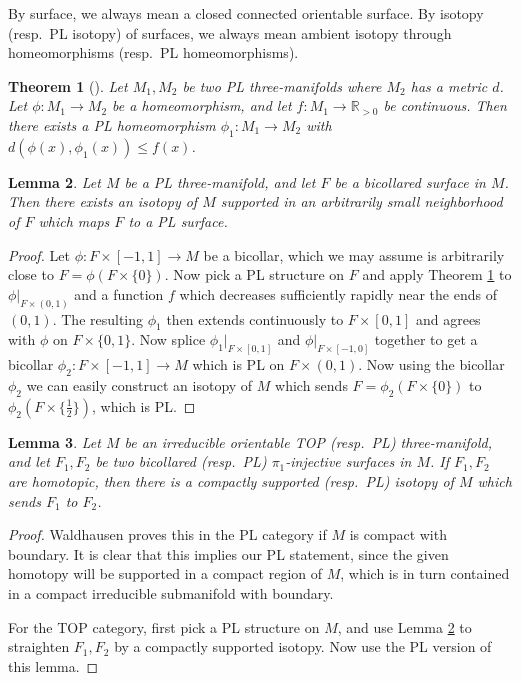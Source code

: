 \documentclass[12pt]{article}
\theoremstyle{plain}
\newtheorem{theorem}{Theorem}[section]
\newtheorem{lemma}[theorem]{Lemma}
\theoremstyle{definition}
\theoremstyle{remark}
\numberwithin{equation}{section}
\begin{document}
By surface, we always mean a closed connected orientable surface.  By isotopy (resp.\ PL isotopy) of surfaces, we always mean ambient isotopy through homeomorphisms (resp.\ PL homeomorphisms).

\begin{theorem}[{\cite[p62 Theorem 8]{bing}}]\label{bingplapproxthm}
Let $M_1,M_2$ be two PL three-manifolds where $M_2$ has a metric $d$.  Let $\phi:M_1\to M_2$ be a homeomorphism, and let $f:M_1\to\mathbb R_{>0}$ be continuous.  Then there exists a PL homeomorphism $\phi_1:M_1\to M_2$ with $d(\phi(x),\phi_1(x))\leq f(x)$.
\end{theorem}

\begin{lemma}\label{straightening}
Let $M$ be a PL three-manifold, and let $F$ be a bicollared surface in $M$.  Then there exists an isotopy of $M$ supported in an arbitrarily small neighborhood of $F$ which maps $F$ to a PL surface.
\end{lemma}

\begin{proof}
Let $\phi:F\times[-1,1]\to M$ be a bicollar, which we may assume is arbitrarily close to $F=\phi(F\times\{0\})$.  Now pick a PL structure on $F$ and apply Theorem \ref{bingplapproxthm} to $\phi|_{F\times(0,1)}$ and a function $f$ which decreases sufficiently rapidly near the ends of $(0,1)$.  The resulting $\phi_1$ then extends continuously to $F\times[0,1]$ and agrees with $\phi$ on $F\times\{0,1\}$.  Now splice $\phi_1|_{F\times[0,1]}$ and $\phi|_{F\times[-1,0]}$ together to get a bicollar $\phi_2:F\times[-1,1]\to M$ which is PL on $F\times(0,1)$.  Now using the bicollar $\phi_2$ we can easily construct an isotopy of $M$ which sends $F=\phi_2(F\times\{0\})$ to $\phi_2(F\times\{\frac 12\})$, which is PL.
\end{proof}

\begin{lemma}\label{homotopicisotopic}
Let $M$ be an irreducible orientable TOP (resp.\ PL) three-manifold, and let $F_1,F_2$ be two bicollared (resp.\ PL) $\pi_1$-injective surfaces in $M$.  If $F_1,F_2$ are homotopic, then there is a compactly supported (resp.\ PL) isotopy of $M$ which sends $F_1$ to $F_2$.
\end{lemma}

\begin{proof}
Waldhausen \cite[p76 Corollary 5.5]{waldhausen} proves this in the PL category if $M$ is compact with boundary.  It is clear that this implies our PL statement, since the given homotopy will be supported in a compact region of $M$, which is in turn contained in a compact irreducible submanifold with boundary.

For the TOP category, first pick a PL structure on $M$, and use Lemma \ref{straightening} to straighten $F_1,F_2$ by a compactly supported isotopy.  Now use the PL version of this lemma.
\end{proof}
\end{document}
